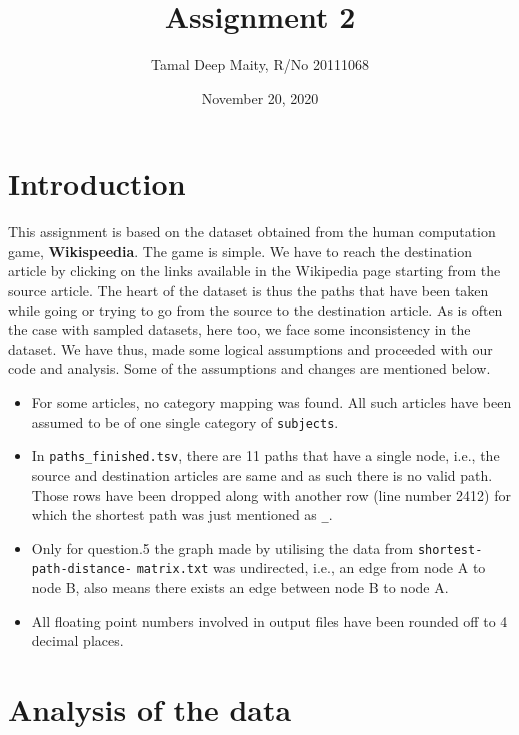 \documentclass[letterpaper,12pt]{article}
\begin{document}
\title{Assignment 2}
\author{Tamal Deep Maity, R/No 20111068}
\date {November 20, 2020}
\maketitle


\section{Introduction}

This assignment is based on the dataset obtained from the human computation game,  \textbf{Wikispeedia}. The game is simple. We have to reach the destination article by clicking on the links available in the Wikipedia page starting from the source article. The heart of the dataset is thus the paths that have been taken while going or trying to go from the source to the destination article. As is often the case with sampled datasets, here too, we face some inconsistency in the dataset. We have thus, made some logical assumptions and proceeded with our code and analysis. Some of the assumptions and changes are mentioned below. 

\begin{itemize}
    \item For some articles, no category mapping was found. All such articles have been assumed to be of one single category of \verb|subjects|. 
    \item In \verb|paths_finished.tsv|, there are 11 paths that have a single node, i.e., the source and destination articles are same and as such there is no valid path. Those rows have been dropped along with another row (line number 2412) for which the shortest path was just mentioned as \verb|_|.
    \item Only for question.5 the graph made by utilising the data from  \verb|shortest-path-distance-| \verb|matrix.txt| was undirected, i.e., an edge from node A to node B, also means there exists an edge between node B to node A.
    \item All floating point numbers involved in output files have been rounded off to 4 decimal places.
\end{itemize}


\section{Analysis of the data}
\end{document}
